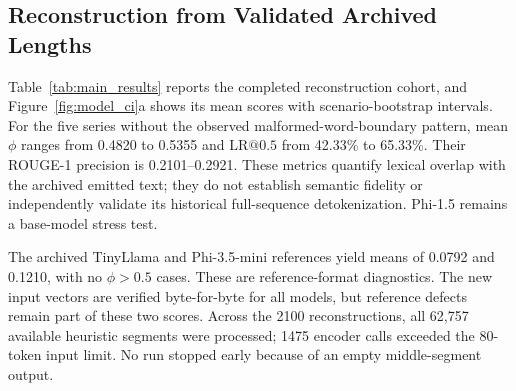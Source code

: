 \documentclass[electronics,article,submit,pdftex,moreauthors]{Definitions/mdpi}
\begin{document}
\subsection{Reconstruction from Validated Archived Lengths}
Table~\ref{tab:main_results} reports the completed reconstruction cohort, and Figure~\ref{fig:model_ci}a shows its mean scores with scenario-bootstrap intervals. For the five series without the observed malformed-word-boundary pattern, mean $\phi$ ranges from 0.4820 to 0.5355 and $\mathrm{LR}@0.5$ from 42.33\% to 65.33\%. Their ROUGE-1 precision is 0.2101--0.2921. These metrics quantify lexical overlap with the archived emitted text; they do not establish semantic fidelity or independently validate its historical full-sequence detokenization. Phi-1.5 remains a base-model stress test.

The archived TinyLlama and Phi-3.5-mini references yield means of 0.0792 and 0.1210, with no $\phi>0.5$ cases. These are reference-format diagnostics. The new input vectors are verified byte-for-byte for all models, but reference defects remain part of these two scores. Across the 2100 reconstructions, all 62,757 available heuristic segments were processed; 1475 encoder calls exceeded the 80-token input limit. No run stopped early because of an empty middle-segment output.

\begin{table}[ht]
\centering
\caption{Completed reconstruction runs from validated archived payload lengths ($N=300$ per model; 512-token victim budget; all available heuristic segments; three samples per segment; 80-token T5 input and output limits). Full archived emitted responses are the references. The final two rows are reference-format diagnostics; input provenance is verified for every row.}
\label{tab:main_results}
\end{table}
\end{document}
